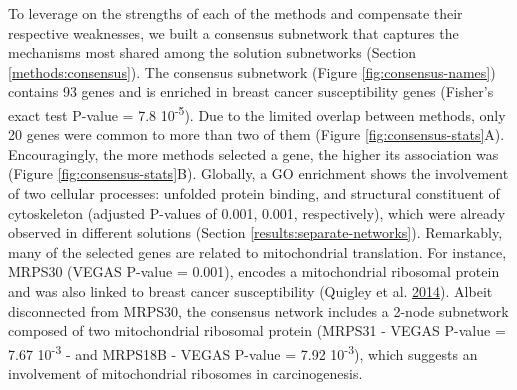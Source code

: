 \documentclass[
  11pt,
]{env/yjiao}
\begin{document}
To leverage on the strengths of each of the methods and compensate their
respective weaknesses, we built a consensus subnetwork that captures the
mechanisms most shared among the solution subnetworks (Section
\ref{methods:consensus}). The consensus subnetwork (Figure
\ref{fig:consensus-names}) contains 93 genes and is enriched in breast
cancer susceptibility genes (Fisher's exact test P-value = 7.8 10\textsuperscript{-5}).
Due to the limited overlap between methods, only 20 genes were common to
more than two of them (Figure \ref{fig:consensus-stats}A). Encouragingly,
the more methods selected a gene, the higher its association was (Figure
\ref{fig:consensus-stats}B). Globally, a GO enrichment shows the
involvement of two cellular processes: unfolded protein binding, and
structural constituent of cytoskeleton (adjusted P-values of 0.001,
0.001, respectively), which were already observed in different solutions
(Section \ref{results:separate-networks}). Remarkably, many of the
selected genes are related to mitochondrial translation. For instance,
MRPS30 (VEGAS P-value = 0.001), encodes a mitochondrial ribosomal
protein and was also linked to breast cancer susceptibility
(Quigley et al. \protect\hyperlink{ref-quigley_5p12_2014}{2014}). Albeit disconnected from MRPS30, the consensus
network includes a 2-node subnetwork composed of two mitochondrial
ribosomal protein (MRPS31 - VEGAS P-value = 7.67 10\textsuperscript{-3} - and MRPS18B -
VEGAS P-value = 7.92 10\textsuperscript{-3}), which suggests an involvement of
mitochondrial ribosomes in carcinogenesis.
\end{document}
